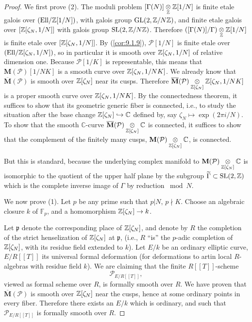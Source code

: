 \begin{proof}
We first prove (2). The moduli problem $[\Gamma(N)] \underset{\mathbb{Z}}{\otimes} \mathbb{Z}[1/N]$ is finite etale galois over $(\mathrm{Ell}/\mathbb{Z}[1/N])$, with galois group $\operatorname{GL}(2, \mathbb{Z}/N\mathbb{Z})$, and finite etale galois over $[\mathbb{Z}[\zeta_N, 1/N]]$ with galois group $\operatorname{SL}(2, \mathbb{Z}/N\mathbb{Z})$. Therefore $([\Gamma(N)]/\Gamma) \underset{\mathbb{Z}}{\otimes} \mathbb{Z}[1/N]$ is finite etale over $[\mathbb{Z}[\zeta_N, 1/N]]$. By (\ref{cor:9.1.9}), $\mathcal{P}[1/N]$ is finite etale over $(\mathrm{Ell}/\mathbb{Z}[\zeta_N, 1/N])$, so in particular it is smooth over $\mathbb{Z}[\zeta_N, 1/N]$ of relative dimension one. Because $\mathcal{P}[1/K]$ is representable, this means that $\mathbf{M}(\mathcal{P})[1/NK]$ is a smooth curve over $\mathbb{Z}[\zeta_N, 1/NK]$. We already know that $\overline{\mathbf{M}}(\mathcal{P})$ is smooth over $\mathbb{Z}[\zeta_N]$ near its cusps. Therefore $\overline{\mathbf{M}}(\mathcal{P}) \underset{\mathbb{Z}[\zeta_N]}{\otimes} \mathbb{Z}[\zeta_N, 1/NK]$ is a proper smooth curve over $\mathbb{Z}[\zeta_N, 1/NK]$. By the connectedness theorem, it suffices to show that its geometric generic fiber is connected, i.e., to study the situation after the base change $\mathbb{Z}[\zeta_N] \hookrightarrow \mathbb{C}$ defined by, say $\zeta_N \mapsto \exp(2\pi i/N)$. To show that the smooth $\mathbb{C}$-curve $\overline{\mathbf{M}}(\mathcal{P}) \underset{\mathbb{Z}[\zeta_N]}{\otimes} \mathbb{C}$ is connected, it suffices to show that the complement of the finitely many cusps, $\mathbf{M}(\mathcal{P}) \underset{\mathbb{Z}[\zeta_N]}{\otimes} \mathbb{C}$, is connected.
\par
But this is standard, because the underlying complex manifold to $\mathbf{M}(\mathcal{P}) \underset{\mathbb{Z}[\zeta_N]}{\otimes} \mathbb{C}$ is isomorphic to the quotient of the upper half plane by the subgroup $\widetilde{\Gamma} \subset \operatorname{SL}(2,\mathbb{Z})$ which is the complete inverse image of $\Gamma$ by reduction $\bmod N$.
\par
We now prove (1). Let $p$ be any prime such that $p|N$, $p \nmid K$. Choose an algebraic closure $k$ of $\mathbb{F}_p$, and a homomorphism $\mathbb{Z}[\zeta_N] \to k$.
\par
Let $\mathfrak{p}$ denote the corresponding place of $\mathbb{Z}[\zeta_N]$, and denote by $R$ the completion of the strict henselization of $\mathbb{Z}[\zeta_N]$ at $\mathfrak{p}$, (i.e., $R$ ``is'' the $p$-adic completion of $\mathbb{Z}[\zeta_N]$, with its residue field extended to $k$). Let $E/k$ be an ordinary elliptic curve, $E/R[[T]]$ its universal formal deformation (for deformations to artin local $R$-algebras with residue field $k$). We are claiming that the finite $R[[T]]$-scheme
\[
\mathcal{P}_{E/R[[T]]} ,
\]
viewed as formal scheme over $R$, is formally smooth over $R$. We have proven that $\overline{\mathbf{M}}(\mathcal{P})$ is smooth over $\mathbb{Z}[\zeta_N]$ near the cusps, hence at some ordinary points in every fiber. Therefore there exists an $E/k$ which is ordinary, and such that $\mathcal{P}_{E/R[[T]]}$ is formally smooth over $R$.

\end{proof}
